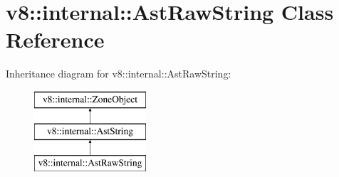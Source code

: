 \hypertarget{classv8_1_1internal_1_1_ast_raw_string}{}\section{v8\+:\+:internal\+:\+:Ast\+Raw\+String Class Reference}
\label{classv8_1_1internal_1_1_ast_raw_string}
Inheritance diagram for v8\+:\+:internal\+:\+:Ast\+Raw\+String\+:\begin{figure}[H]
\begin{center}
\leavevmode
\includegraphics[height=3.000000cm]{classv8_1_1internal_1_1_ast_raw_string}
\end{center}
\end{figure}
